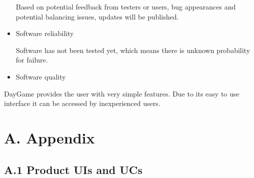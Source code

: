 \documentclass[12pt]{report}
\renewcommand{\_}{\kern-1.5pt\textunderscore\kern-1.5pt}
\begin{document}
\begin{itemize}
Based on potential feedback from testers or users, bug appearances and potential balancing issues, updates will be published.\par

	\item {\fontsize{14pt}{16.8pt}\selectfont Software reliability\par}\par

Software has not been tested yet, which means there is unknown probability for failure.\par

	\item {\fontsize{14pt}{16.8pt}\selectfont Software quality\par}
\end{itemize}\par

\begin{adjustwidth}{0.5in}{0.0in}
DayGame provides the user with very simple features. Due to its easy to use interface it can be accessed by inexperienced users. \par

\end{adjustwidth}


\vspace{\baselineskip}
\section*{A. Appendix}
\subsection*{A.1 Product UIs and UCs}
\end{document}
